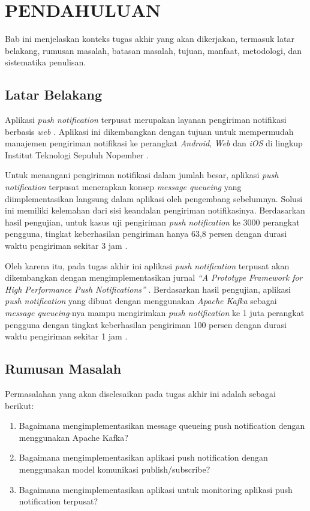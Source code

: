 \vspace{0ex}
\chapter {PENDAHULUAN}
\par Bab ini menjelaskan konteks tugas akhir yang akan dikerjakan, termasuk latar belakang, rumusan masalah, batasan masalah, tujuan, manfaat, metodologi, dan sistematika penulisan.

\section{Latar Belakang}
\par Aplikasi \textit{push notification} terpusat merupakan layanan pengiriman notifikasi berbasis \textit{web} \cite{application-thesis}. Aplikasi ini dikembangkan dengan tujuan untuk mempermudah manajemen pengiriman notifikasi ke perangkat \textit{Android}, \textit{Web} dan \textit{iOS} di lingkup Institut Teknologi Sepuluh Nopember \cite{application-thesis}.
\par Untuk menangani pengiriman notifikasi dalam jumlah besar, aplikasi \textit{push notification} terpusat menerapkan konsep \textit{message queueing} yang diimplementasikan langsung dalam aplikasi oleh pengembang sebelumnya. Solusi ini memiliki kelemahan dari sisi keandalan pengiriman notifikasinya. Berdasarkan hasil pengujian, untuk kasus uji pengiriman \textit{push notification} ke 3000 perangkat pengguna, tingkat keberhasilan pengiriman hanya 63,8 persen dengan durasi waktu pengiriman sekitar 3 jam \cite{application-thesis}.
\par Oleh karena itu, pada tugas akhir ini aplikasi \textit{push notification} terpusat akan dikembangkan dengan mengimplementasikan jurnal \textit{“A Prototype Framework for High Performance Push Notifications”} \cite{prototype-article}. Berdasarkan hasil pengujian, aplikasi \textit{push notification} yang dibuat dengan menggunakan \textit{Apache Kafka} sebagai \textit{message queueing}-nya mampu mengirimkan \textit{push notification} ke 1 juta perangkat pengguna dengan tingkat keberhasilan pengiriman 100 persen dengan durasi waktu pengiriman sekitar 1 jam \cite{prototype-article}.

\section {Rumusan Masalah}
Permasalahan yang akan diselesaikan pada tugas akhir ini adalah sebagai berikut:
\begin {enumerate}
\item Bagaimana mengimplementasikan message queueing push notification dengan menggunakan Apache Kafka?
\item Bagaimana mengimplementasikan aplikasi push notification dengan menggunakan model komunikasi publish/subscribe?
\item Bagaimana mengimplementasikan aplikasi untuk monitoring aplikasi push notification terpusat?
\end {enumerate}

